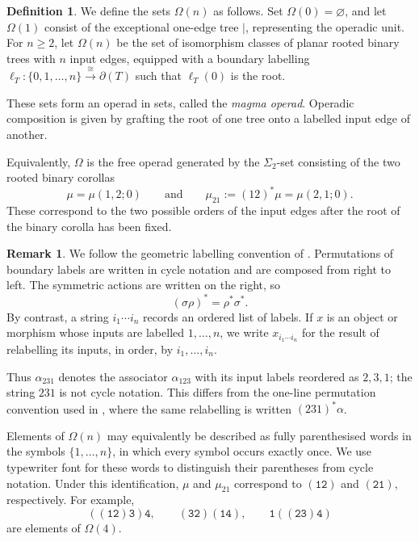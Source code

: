 \documentclass{amsart}
\newcommand{\magma}{\mathsf{\Omega}}
\theoremstyle{definition}
\newtheorem{definition}[theorem]{Definition}%
\newtheorem{remark}[theorem]{Remark}%
\numberwithin{equation}{section}
\begin{document}
\begin{definition}
\label{def:magma_operad}
We define the sets $\magma(n)$ as follows. Set
$\magma(0)=\varnothing$, and let $\magma(1)$ consist of the exceptional
one-edge tree $\lvert$, representing the operadic unit. For $n\geq2$,
let $\magma(n)$ be the set of isomorphism classes of planar rooted
binary trees with $n$ input edges, equipped with a boundary labelling
$\ell_T\colon\{0,1,\ldots,n\}\xrightarrow{\cong}\partial(T)$ such that
$\ell_T(0)$ is the root.

These sets form an operad in sets, called the \emph{magma operad}.
Operadic composition is given by grafting the root of one tree onto a
labelled input edge of another.

Equivalently, $\magma$ is the free operad generated by the
$\Sigma_2$-set consisting of the two rooted binary corollas
\[
\mu=\mu(1,2;0) 
\qquad \text{and} \qquad
\mu_{21}:=(12)^*\mu=\mu(2,1;0).
\]
These correspond to the two possible orders of the input edges after the root of the binary corolla has been fixed.
\end{definition}

\begin{remark}
\label{rem: permutation conventions PaRB}
We follow the geometric labelling convention of \cite[Section~3.1]{campos2019configuration}. Permutations of boundary labels are written in cycle notation and are composed from right to left. The symmetric actions are written on the right, so
\[
(\sigma\rho)^*=\rho^*\sigma^*.
\]
By contrast, a string $i_1\cdots i_n$ records an ordered list of labels. If $x$ is an object or morphism whose inputs are labelled $1,\ldots,n$, we write $x_{i_1\cdots i_n}$ for the result of relabelling its inputs, in order, by $i_1,\ldots,i_n$.

Thus $\alpha_{231}$ denotes the associator $\alpha_{123}$ with its input labels reordered as $2,3,1$; the string $231$ is not cycle notation. This differs from the one-line permutation convention used in \cite{Boavida-Horel-Robertson}, where the same relabelling is written $(231)^*\alpha$.
\end{remark}

Elements of $\magma(n)$ may equivalently be described as fully
parenthesised words in the symbols $\{1,\ldots,n\}$, in which every
symbol occurs exactly once. We use typewriter font for these words to
distinguish their parentheses from cycle notation. Under this
identification, $\mu$ and $\mu_{21}$ correspond to
$\mathtt{(12)}$ and $\mathtt{(21)}$, respectively. For example,
\[
\mathtt{((12)3)4},
\qquad
\mathtt{(32)(14)},
\qquad
\mathtt{1((23)4)}
\]
are elements of $\magma(4)$.
\end{document}
